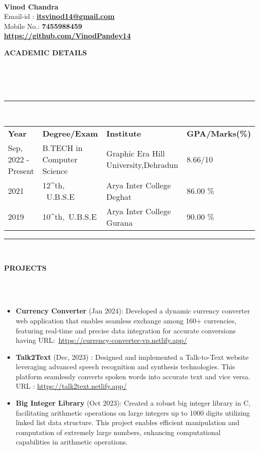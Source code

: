 \documentclass[a4paper,10pt]{article}
\newcommand{\lsep}{-0.5cm}
\newcommand{\resheading}[1]{{\small \colorbox{mygrey}{\begin{minipage}{0.975\textwidth}{\textbf{#1 \vphantom{p\^{E}}}}\end{minipage}}}}
\begin{document}
\hspace{0.5cm}\\[-0.2cm]

\textbf{Vinod Chandra} \\
\indent Email-id : \textbf{\url{itsvinod14@gmail.com}} \\
\indent Mobile No.: \textbf{7455988459} \ \\
\indent \textbf{\url{https://github.com/VinodPandey14}}\\

\resheading{\textbf{ACADEMIC DETAILS} }\\[\lsep]
\\
\\
\indent \rule{6.8in}{0.4pt}\\
\indent \begin{tabular}{ l @{\hskip 0.15in} l @{\hskip 0.15in} l @{\hskip 0.15in} l @{\hskip 0.15in} }
\noindent \textbf{Year} & \textbf{Degree/Exam} & \textbf{Institute} & \textbf{GPA/Marks(\%)}\\
Sep, 2022 - Present & B.TECH in Computer Science & Graphic Era Hill University,Dehradun & 8.66/10\\
2021 & 12^{th}, \ U.B.S.E & Arya Inter College Deghat & 86.00 \% \\
2019 & 10^{th},\ U.B.S.E & Arya Inter College Gurana & 90.00 \%\\

\end{tabular}
\indent \rule{6.8in}{0.4pt}
\\

\resheading{\textbf{PROJECTS} }\\[\lsep]
\\
\begin{itemize}
\setlength\itemsep{0.5em}
\item \textbf{Currency Converter} (Jan 2024): Developed a dynamic currency converter web application that enables seamless exchange among 160+ currencies, featuring real-time and precise data integration for accurate conversions having URL:\ 
\url{https://currency-converter-vp.netlify.app/}
\\
\item \textbf{Talk2Text} (Dec, 2023) : Designed and implemented a Talk-to-Text website leveraging advanced speech recognition and synthesis technologies. This platform seamlessly converts spoken words into accurate text and vice versa.
URL : \url{https://talk2text.netlify.app/}
\\
\item \textbf{Big Integer Library} (Oct 2023): Created a robust big integer library in C, facilitating arithmetic operations on large integers up to 1000 digits utilizing linked list data structure. This project enables efficient manipulation and computation of extremely large numbers, enhancing computational capabilities in arithmetic operations.
\\
\end{itemize}
\end{document}
